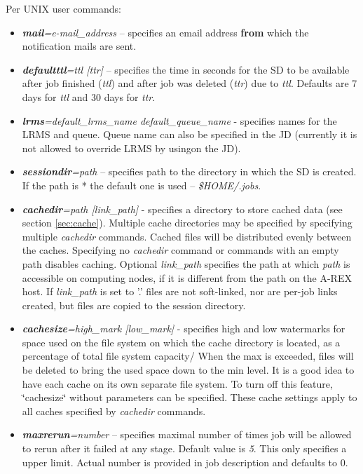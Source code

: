 \documentclass{article}                            %
\begin{document}
Per UNIX user commands:

\begin{itemize}
\item \textbf{\textit{mail}}\textit{=e-mail\_address} -- specifies an email
address \textbf{from} which the notification mails are sent.
\item \textbf{\textit{defaultttl}}\textit{=ttl {[}ttr]} -- specifies the
time in seconds for the SD to be available after job finished (\emph{ttl})
and after job was deleted (\emph{ttr}) due to \emph{ttl}. Defaults
are 7 days for \emph{ttl} and 30 days for \emph{ttr}.
\item \textbf{\textit{lrms}}\textit{=default\_lrms\_name default\_queue\_name}
- specifies names for the LRMS and queue. Queue name can also be specified
in the JD (currently it is not allowed to override LRMS by usingon
the JD).
\item \textbf{\textit{sessiondir}}\textit{=path} -- specifies path to the directory
in which the SD is created. If the path is {*} the default one is
used -- \textit{\$HOME/.jobs}.
\item \textbf{\textit{cachedir}}\textit{=path {[}link\_path]} - specifies
a directory to store cached data (see section \ref{sec:cache}). Multiple
cache directories may be specified by specifying multiple \emph{cachedir}
commands. Cached files will be distributed evenly between the caches.
Specifying no \emph{cachedir }command or commands with an empty path
disables caching. Optional \textit{link\_path} specifies the path
at which \emph{path} is accessible on computing nodes, if it is different
from the path on the A-REX host. If \textit{link\_path} is set to '.'
files are not soft-linked, nor are per-job links created, but files
are copied to the session directory.
\item \textbf{\textit{cachesize}}\textit{=high\_mark {[}low\_mark]} -
  specifies high and low watermarks for space used on the file system
  on which the cache directory is located, as a percentage of total
  file system capacity/ When the max is exceeded, files will be
  deleted to bring the used space down to the min level. It is a good
  idea to have each cache on its own separate file system. To turn off
  this feature, \char`\"{}cachesize\char`\"{} without parameters can
  be specified. These cache settings apply to all caches specified by
  \emph{cachedir} commands.
\item \textbf{\textit{maxrerun}}\textit{=number} -- specifies maximal number
of times job will be allowed to rerun after it failed at any stage.
Default value is \emph{5}. This only specifies a upper limit. Actual
number is provided in job description and defaults to 0.
\end{itemize}
\end{document}
